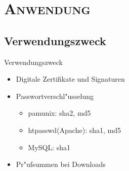 \documentclass[xcolor=x11names,compress]{beamer}
\renewcommand{\(}{\begin{columns}}
\renewcommand{\)}{\end{columns}}
\newcommand{\<}[1]{\begin{column}{#1}}
\renewcommand{\>}{\end{column}}
\begin{document}
\section{\scshape Anwendung}
\subsection{Verwendungszweck}
\begin{frame}{Verwendungszweck}

\begin{itemize}
\item Digitale Zertifikate und Signaturen 
	\pause
\item Passwortverschl"usselung
\begin{itemize}
	\item pam\textunderscore unix: sha2, md5
	\item htpasswd(Apache): sha1, md5
	\item MySQL: sha1
\end{itemize}
\pause
\item Pr"ufsummen bei Downloads
\end{itemize}


\end{frame}
\end{document}
